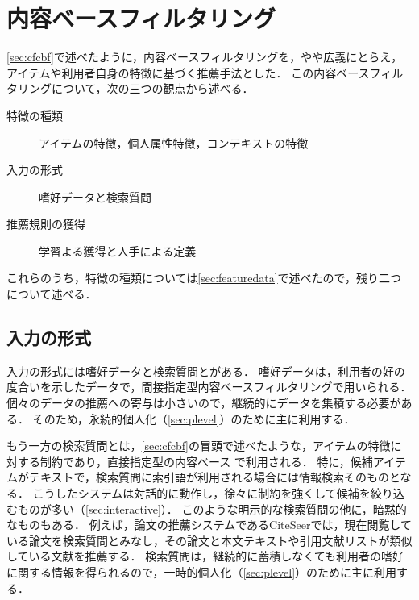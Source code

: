 \chapter{内容ベースフィルタリング}
\label{chap:cbf}

\ref{sec:cfcbf}で述べたように，内容ベースフィルタリングを，やや広義にとらえ，アイテムや利用者自身の特徴に基づく推薦手法とした．
この内容ベースフィルタリングについて，次の三つの観点から述べる．
\begin{description}
 \item[特徴の種類] アイテムの特徴，個人属性特徴，コンテキストの特徴
 \item[入力の形式] 嗜好データと検索質問
 \item[推薦規則の獲得] 学習よる獲得と人手による定義
\end{description}
これらのうち，特徴の種類については\ref{sec:featuredata}で述べたので，残り二つについて述べる．


\section{入力の形式}
\label{sec:cbfinput}

入力の形式には嗜好データと検索質問とがある．
嗜好データは，利用者の好の度合いを示したデータで，間接指定型内容ベースフィルタリング\cite{misc:091,tjsai:05:05,trjsai:06:01}で用いられる．
個々のデータの推薦への寄与は小さいので，継続的にデータを集積する必要がある．
そのため，永続的個人化（\ref{sec:plevel}）のために主に利用する．

もう一方の検索質問とは，\ref{sec:cfcbf}の冒頭で述べたような，アイテムの特徴に対する制約であり，直接指定型の内容ベース
\cite{ec:024,ijcai:03:04,jair:04:01,ieeem:07:06}で利用される．
特に，候補アイテムがテキストで，検索質問に索引語が利用される場合には情報検索\cite{jb:012:00}そのものとなる．
こうしたシステムは対話的に動作し，徐々に制約を強くして候補を絞り込むものが多い（\ref{sec:interactive}）．
このような明示的な検索質問の他に，暗黙的なものもある．
例えば，論文の推薦システムであるCiteSeer\cite{ieeem:99:02}では，現在閲覧している論文を検索質問とみなし，その論文と本文テキストや引用文献リストが類似している文献を推薦する．
検索質問は，継続的に蓄積しなくても利用者の嗜好に関する情報を得られるので，一時的個人化（\ref{sec:plevel}）のために主に利用する．


